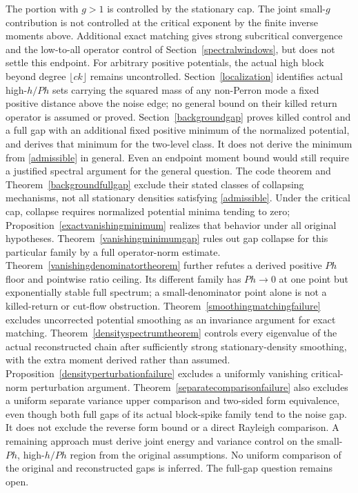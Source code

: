 \documentclass[11pt]{article}
\begin{document}
The portion with $g>1$ is controlled by the stationary cap. The joint small-$g$ contribution is not controlled at the critical exponent by the finite inverse moments above. Additional exact matching gives strong subcritical convergence and the low-to-all operator control of Section~\ref{spectralwindows}, but does not settle this endpoint. For arbitrary positive potentials, the actual high block beyond degree $\lfloor ck\rfloor$ remains uncontrolled. Section~\ref{localization} identifies actual high-$h/Ph$ sets carrying the squared mass of any non-Perron mode a fixed positive distance above the noise edge; no general bound on their killed return operator is assumed or proved. Section~\ref{backgroundgap} proves killed control and a full gap with an additional fixed positive minimum of the normalized potential, and derives that minimum for the two-level class. It does not derive the minimum from \eqref{admissible} in general. Even an endpoint moment bound would still require a justified spectral argument for the general question. The code theorem and Theorem~\ref{backgroundfullgap} exclude their stated classes of collapsing mechanisms, not all stationary densities satisfying \eqref{admissible}. Under the critical cap, collapse requires normalized potential minima tending to zero; Proposition~\ref{exactvanishingminimum} realizes that behavior under all original hypotheses. Theorem~\ref{vanishingminimumgap} rules out gap collapse for this particular family by a full operator-norm estimate. Theorem~\ref{vanishingdenominatortheorem} further refutes a derived positive $Ph$ floor and pointwise ratio ceiling. Its different family has $Ph\to0$ at one point but exponentially stable full spectrum; a small-denominator point alone is not a killed-return or cut-flow obstruction. Theorem~\ref{smoothingmatchingfailure} excludes uncorrected potential smoothing as an invariance argument for exact matching. Theorem~\ref{densityspectrumtheorem} controls every eigenvalue of the actual reconstructed chain after sufficiently strong stationary-density smoothing, with the extra moment derived rather than assumed. Proposition~\ref{densityperturbationfailure} excludes a uniformly vanishing critical-norm perturbation argument. Theorem~\ref{separatecomparisonfailure} also excludes a uniform separate variance upper comparison and two-sided form equivalence, even though both full gaps of its actual block-spike family tend to the noise gap. It does not exclude the reverse form bound or a direct Rayleigh comparison. A remaining approach must derive joint energy and variance control on the small-$Ph$, high-$h/Ph$ region from the original assumptions. No uniform comparison of the original and reconstructed gaps is inferred. The full-gap question remains open.
\end{document}
